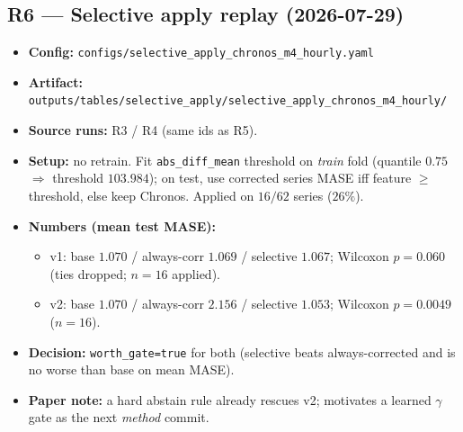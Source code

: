 \subsection*{R6 --- Selective apply replay (2026-07-29)}
\begin{itemize}
  \item \textbf{Config:} \texttt{configs/selective\_apply\_chronos\_m4\_hourly.yaml}
  \item \textbf{Artifact:}
        \texttt{outputs/tables/selective\_apply/selective\_apply\_chronos\_m4\_hourly/}
  \item \textbf{Source runs:} R3 / R4 (same ids as R5).
  \item \textbf{Setup:} no retrain. Fit \texttt{abs\_diff\_mean} threshold on
        \emph{train} fold (quantile $0.75$ $\Rightarrow$ threshold $103.984$);
        on test, use corrected series MASE iff feature $\ge$ threshold, else
        keep Chronos. Applied on $16/62$ series ($26\%$).
  \item \textbf{Numbers (mean test MASE):}
        \begin{itemize}
          \item v1: base $1.070$ / always-corr $1.069$ / selective $1.067$;
                Wilcoxon $p=0.060$ (ties dropped; $n=16$ applied).
          \item v2: base $1.070$ / always-corr $2.156$ / selective $1.053$;
                Wilcoxon $p=0.0049$ ($n=16$).
        \end{itemize}
  \item \textbf{Decision:} \texttt{worth\_gate=true} for both (selective beats
        always-corrected and is no worse than base on mean MASE).
  \item \textbf{Paper note:} a hard abstain rule already rescues v2; motivates a
        learned $\gamma$ gate as the next \emph{method} commit.
\end{itemize}

